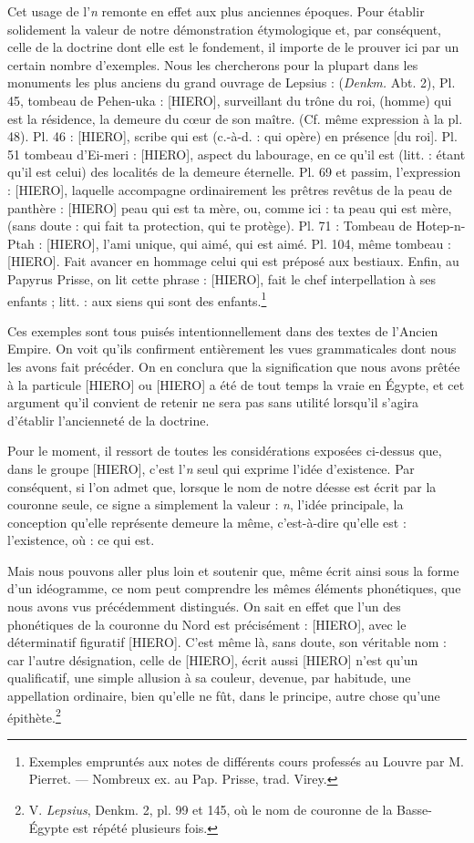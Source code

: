 \documentclass[a4paper, 11pt, oneside]{article}
\begin{document}
Cet usage de l'\emph{n} remonte en effet aux plus anciennes époques. Pour établir solidement la valeur de notre démonstration étymologique et, par conséquent, celle de la doctrine dont elle est le fondement, il importe de le prouver ici par un certain nombre d'exemples. Nous les chercherons pour la plupart dans les monuments les plus anciens du grand ouvrage de Lepsius : (\emph{Denkm.} Abt. 2), Pl. 45, tombeau de Pehen-uka : [HIERO], surveillant du trône du roi, (homme) qui est la résidence, la demeure du cœur de son maître. (Cf. même expression à la pl. 48). Pl. 46 : [HIERO], scribe qui est (c.-à-d. : qui opère) en présence [du roi]. Pl. 51 tombeau d'Ei-meri : [HIERO], aspect du labourage, en ce qu'il est (litt. : étant qu’il est celui) des localités de la demeure éternelle. Pl. 69 et passim, l'expression : [HIERO], laquelle accompagne ordinairement les prêtres revêtus de la peau de panthère : [HIERO] peau qui est ta mère, ou, comme ici : ta peau qui est mère, (sans doute : qui fait ta protection, qui te protège). Pl. 71 : Tombeau de Hotep-n-Ptah : [HIERO], l'ami unique, qui aimé, qui est aimé. Pl. 104, même tombeau : [HIERO]. Fait avancer en hommage celui qui est préposé aux bestiaux. Enfin, au Papyrus Prisse, on lit cette phrase : [HIERO], fait le chef interpellation à ses enfants ; litt. : aux siens qui sont des enfants.\footnote{Exemples empruntés aux notes de différents cours professés au Louvre par M. Pierret. --- Nombreux ex. au Pap. Prisse, trad. Virey.}

Ces exemples sont tous puisés intentionnellement dans des textes de l'Ancien Empire. On voit qu'ils confirment entièrement les vues grammaticales dont nous les avons fait précéder. On en conclura que la signification que nous avons prêtée à la particule [HIERO] ou [HIERO] a été de tout temps la vraie en Égypte, et cet argument qu'il convient de retenir ne sera pas sans utilité lorsqu'il s'agira d'établir l'ancienneté de la doctrine.

Pour le moment, il ressort de toutes les considérations exposées ci-dessus que, dans le groupe [HIERO], c'est l'\emph{n} seul qui exprime l'idée d'existence. Par conséquent, si l'on admet que, lorsque le nom de notre déesse est écrit par la couronne seule, ce signe a simplement la valeur : \emph{n}, l'idée principale, la conception qu'elle représente demeure la même, c'est-à-dire qu'elle est : l'existence, où : ce qui est.

Mais nous pouvons aller plus loin et soutenir que, même écrit ainsi sous la forme d'un idéogramme, ce nom peut comprendre les mêmes éléments phonétiques, que nous avons vus précédemment distingués. On sait en effet que l'un des phonétiques de la couronne du Nord est précisément : [HIERO], avec le déterminatif figuratif [HIERO]. C'est même là, sans doute, son véritable nom : car l'autre désignation, celle de [HIERO], écrit aussi [HIERO] n'est qu'un qualificatif, une simple allusion à sa couleur, devenue, par habitude, une appellation ordinaire, bien qu'elle ne fût, dans le principe, autre chose qu'une épithète.\footnote{V. \emph{Lepsius}, Denkm. 2, pl. 99 et 145, où le nom de couronne de la Basse-Égypte est répété plusieurs fois.}
\end{document}
